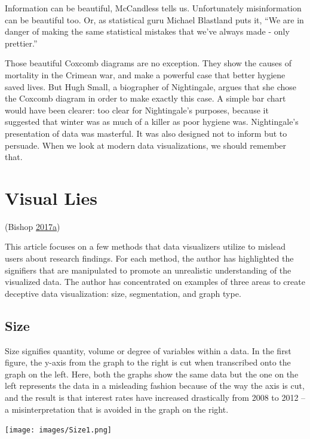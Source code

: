 \documentclass[]{book}
\begin{document}
Information can be beautiful, McCandless tells us. Unfortunately misinformation can be beautiful too. Or, as statistical guru Michael Blastland puts it, ``We are in danger of making the same statistical mistakes that we've always made - only prettier.''

Those beautiful Coxcomb diagrams are no exception. They show the causes of mortality in the Crimean war, and make a powerful case that better hygiene saved lives. But Hugh Small, a biographer of Nightingale, argues that she chose the Coxcomb diagram in order to make exactly this case. A simple bar chart would have been clearer: too clear for Nightingale's purposes, because it suggested that winter was as much of a killer as poor hygiene was. Nightingale's presentation of data was masterful. It was also designed not to inform but to persuade. When we look at modern data visualizations, we should remember that.

\hypertarget{visual-lies}{%
\section{Visual Lies}\label{visual-lies}}

(Bishop \protect\hyperlink{ref-visual-lies}{2017}\protect\hyperlink{ref-visual-lies}{a})

This article focuses on a few methods that data visualizers utilize to mislead users about research findings. For each method, the author has highlighted the signifiers that are manipulated to promote an unrealistic understanding of the visualized data. The author has concentrated on examples of three areas to create deceptive data visualization: size, segmentation, and graph type.

\hypertarget{size}{%
\subsection{Size}\label{size}}

Size signifies quantity, volume or degree of variables within a data. In the first figure, the y-axis from the graph to the right is cut when transcribed onto the graph on the left. Here, both the graphs show the same data but the one on the left represents the data in a misleading fashion because of the way the axis is cut, and the result is that interest rates have increased drastically from 2008 to 2012 -- a misinterpretation that is avoided in the graph on the right.

\texttt{[image: images/Size1.png]}
\end{document}
